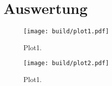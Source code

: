 \section{Auswertung}
\label{sec:Auswertung}
\begin{figure}
  \centering
  \texttt{[image: build/plot1.pdf]}
  \caption{Plot1.}
  \label{fig:plot1}
\end{figure}
\begin{figure}
  \centering
  \texttt{[image: build/plot2.pdf]}
  \caption{Plot1.}
  \label{fig:plot2}
\end{figure}
